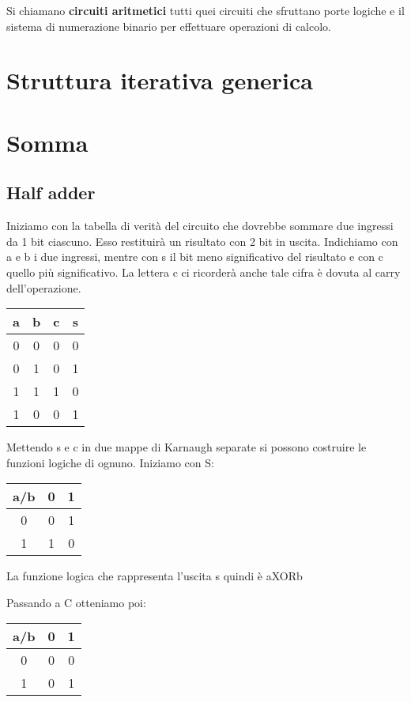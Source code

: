 \documentclass{book}
\begin{document}
Si chiamano \textbf{circuiti aritmetici} tutti quei circuiti che sfruttano porte logiche e il sistema di numerazione binario per effettuare operazioni di calcolo.


\section{Struttura iterativa generica}

\section{Somma}

\subsection*{Half adder}
Iniziamo con la tabella di verità del circuito che dovrebbe sommare due ingressi da 1 bit ciascuno.
Esso restituirà un risultato con 2 bit in uscita.
Indichiamo con a e b i due ingressi, mentre con s il bit meno significativo del risultato e con c quello più significativo.
La lettera c ci ricorderà anche tale cifra è dovuta al carry dell'operazione.
\newline
\begin{tabular}{|c|c|c|c|}
\hline
a & b & c & s \\ \hline
0 & 0 & 0 & 0 \\ \hline
0 & 1 & 0 & 1 \\ \hline
1 & 1 & 1 & 0 \\ \hline
1 & 0 & 0 & 1 \\ 
\hline
\end{tabular}



Mettendo s e c in due mappe di Karnaugh separate si possono costruire le funzioni logiche di ognuno.
Iniziamo con S:

\begin{tabular}{|c|c|c|}
\hline
a/b & 0 & 1 \\ \hline
0   & 0 & 1 \\ \hline
1   & 1 & 0 \\ \hline
\end{tabular}

La funzione logica che rappresenta l'uscita s quindi è aXORb

Passando a C otteniamo poi:

\begin{tabular}{|c|c|c|}
\hline
a/b & 0 & 1 \\ \hline
0   & 0 & 0 \\ \hline
1   & 0 & 1 \\ \hline
\end{tabular}
\end{document}
